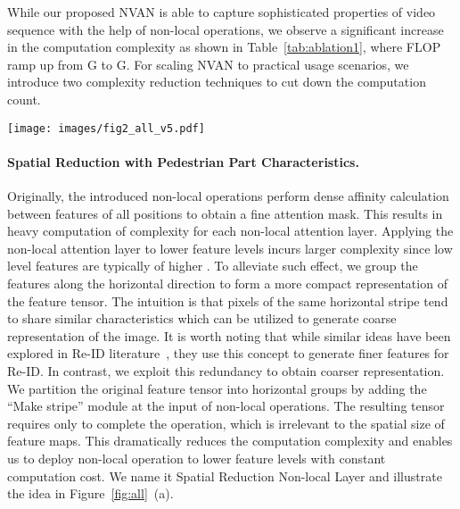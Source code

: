 \documentclass{bmvc2k}
\newcommand{\revctliu}[1]{#1}
\newcommand{\revctliu}[1]{\textcolor{brown}{#1}}
\newcommand{\mycaption}[2]{\caption{\textbf{#1.}~#2}}
\begin{document}
While our proposed NVAN is able to capture sophisticated properties of video sequence with the help of non-local operations, we observe a significant increase in the computation complexity as shown in Table~\ref{tab:ablation1}, \revctliu{where FLOP ramp up from G to G.}
For scaling NVAN to practical usage scenarios, we introduce two complexity reduction techniques to cut down the computation count.
\vspace{-3mm}

\begin{figure*}[t!]
	\centering
    \texttt{[image: images/fig2\_all\_v5.pdf]}
    \mycaption{(a) Spatial Reduction Non-local Layer. (b) Temporal Reduction with Hierarchical Structure}{Details are explained in Section~\ref{sub:STEN}. Noting that, for figure (a), before the residual addition, we repeat the tensor of shape  to . As for figure~(b), we apply max-pooling across adjacent features after the stages with non-local layers to construct our hierarchical structure.}
    \label{fig:all}
    \vspace{-3mm}
\end{figure*}
\paragraph{Spatial Reduction with Pedestrian Part Characteristics.}
Originally, the introduced non-local operations perform dense affinity calculation between features of all  positions to obtain a fine attention mask.
This results in heavy computation of complexity  for each non-local attention layer. 
Applying the \revctliu{non-local attention} layer to lower feature levels incurs larger complexity since low level features are typically of higher .
To alleviate such effect, we group the features along the horizontal direction to form a more compact representation of the feature tensor.
The intuition is that pixels of the same horizontal stripe tend to share similar characteristics which can be utilized to generate coarse representation of the image.
It is worth noting that while similar ideas have been explored in Re-ID literature~\cite{pcb,deepfusion,cheng2016person,lomo}, they use this concept to generate finer features for Re-ID.
In contrast, we exploit this redundancy to obtain coarser representation.
We partition the original feature tensor  into  horizontal groups by adding the ``Make stripe'' module at the input of non-local operations.
The resulting tensor  requires only  to complete the operation, which is irrelevant to the spatial size of feature maps.
This dramatically reduces the computation complexity and enables us to deploy non-local operation to lower feature levels with constant computation cost.
We name it Spatial Reduction Non-local Layer and illustrate the idea in Figure~\ref{fig:all}~(a).
\end{document}
